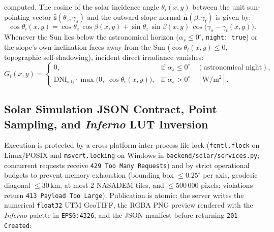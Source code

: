 \documentclass[11pt,a4paper]{article}
\newcommand{\src}[1]{\nolinkurl{#1}}
\newcommand{\unit}[1]{\mathrm{#1}}
\begin{document}
\begin{enumerate}
        computed. The cosine of the solar incidence angle $\theta_i(x,y)$ between the unit sun-pointing vector
        $\hat{\mathbf{s}}(\theta_z, \gamma_s)$ and the outward slope normal $\hat{\mathbf{n}}(\beta, \gamma_t)$
        is given by:
        \begin{equation}
          \cos\theta_i(x,y) = \cos\theta_z\,\cos\beta(x,y)
          + \sin\theta_z\,\sin\beta(x,y)\,\cos\!\bigl(\gamma_s - \gamma_t(x,y)\bigr).
          \label{eq:solar-cos-incidencia}
        \end{equation}
        Whenever the Sun lies below the astronomical horizon ($\alpha_s \le 0^\circ$, \texttt{night: true}) or
        the slope's own inclination faces away from the Sun ($\cos\theta_i(x,y) \le 0$, topographic
        self-shadowing), incident direct irradiance vanishes:
        \begin{equation}
          G_i(x,y) =
          \begin{cases}
            0, & \text{if } \alpha_s \le 0^\circ \quad (\text{astronomical night}), \\[4pt]
            \mathrm{DNI}_{\mathrm{adj}} \cdot \max\!\bigl(0,\; \cos\theta_i(x,y)\bigr), & \text{if } \alpha_s > 0^\circ
            \quad [\unit{W/m^2}].
          \end{cases}
          \label{eq:solar-gi-incidente}
        \end{equation}
\end{enumerate}

\subsection{Solar Simulation JSON Contract, Point Sampling, and \emph{Inferno} LUT Inversion}

Execution is protected by a cross-platform inter-process file lock (\texttt{fcntl.flock} on Linux/POSIX and
\texttt{msvcrt.locking} on Windows in \src{backend/solar/services.py}; concurrent requests receive
\texttt{429 Too Many Requests}) and by strict operational budgets to prevent memory exhaustion (bounding box
$\le 0.25^\circ$ per axis, geodesic diagonal $\le 30\,\unit{km}$, at most 2 NASADEM tiles, and $\le 500\,000$
pixels; violations return \texttt{413 Payload Too Large}). Publication is atomic: the server writes the numerical
\texttt{float32} UTM GeoTIFF, the RGBA PNG preview rendered with the \emph{Inferno} palette in \texttt{EPSG:4326},
and the JSON manifest before returning \texttt{201 Created}:
\end{document}
